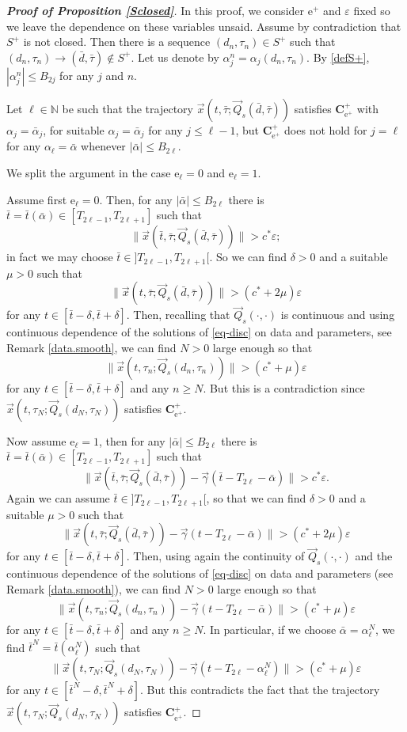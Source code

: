 \documentclass[10pt]{article}
\numberwithin{equation}{section}
\def\al{\alpha}
\def\ga{\vec{\gamma}}
\def\ep{\varepsilon}
\def\N{{\mathbb N}}
\def\ee{{\mathrm e}}
\def\Q{\vec{Q}}
\def\x{\vec{x}}
\newcommand\bs[1]{{\boldsymbol{#1}}}
\theoremstyle{definition}
\theoremstyle{remark}
\begin{document}
\begin{proof}[\textbf{Proof of Proposition \ref{Sclosed}}]
In this proof, we consider $\ee^+$ and $\ep$ fixed so we leave the dependence on these variables unsaid.
Assume by contradiction that $S^+$ is not closed. Then there is a sequence $(d_n, \tau_n) \in S^+$ such that
$(d_n, \tau_n)\to  (\bar{d}, \bar{\tau}) \not\in S^+$. Let us denote by  $\alpha_j^n=\alpha_j(d_n, \tau_n)$.
 By  \eqref{defS+}, $|\alpha_j^n | \le B_{2j}$ for any $j$ and $n$.


Let  $\ell \in \N$
be such that the trajectory $\x(t,\bar{\tau}; \Q_s(\bar{d},\bar{\tau}))$
satisfies $\bs{C^+_{\ee^+}}$  with   $\alpha_j = \bar{\alpha}_j$,
 for suitable
   $\alpha_j = \bar{\alpha}_j$
 for any $j \le \ell-1$, but $\bs{C^+_{\ee^+}}$ does not hold
 for $j=\ell$   for any $\alpha_{\ell}= \bar{\alpha}$ whenever $|\bar{\alpha}| \le B_{2 \ell}$.

We split the argument in the case $\ee_\ell=0$ and $\ee_\ell=1$.

Assume first $\ee_\ell=0$.
Then,  for any $|\bar{\alpha}| \le B_{2\ell}$ there is $\bar{t}=\bar{t}(\bar{\alpha}) \in [T_{2\ell-1},T_{2\ell+1}]$  such that
$$\|\x(\bar{t},\bar{\tau}; \Q_s(\bar{d},\bar{\tau})) \| >  c^*\ep ;$$
 in fact we may choose    $\bar{t}\in]T_{2\ell-1},T_{2\ell+1}[$.
So we can find $\delta>0$ and a suitable $\mu>0$ such that
$$\|\x(t,\bar{\tau}; \Q_s(\bar{d},\bar{\tau})) \| >  (c^*+2\mu) \ep $$
for any $t \in [\bar{t}-\delta, \bar{t}+\delta]$.
Then,  recalling that $\Q_s(\cdot,\cdot)$ is continuous  and using continuous dependence of the solutions of \eqref{eq-disc} on data and
parameters, see Remark \ref{data.smooth},
we can find $N>0$ large enough so that
$$\|\x(t,\tau_{n}; \Q_s(d_{n},\tau_{n})) \| >  (c^*+\mu) \ep $$
for any $t \in [\bar{t}-\delta, \bar{t}+\delta]$ and any $n \ge N$.
 But this is a contradiction since $\x(t,\tau_{N}; \Q_s(d_{N},\tau_{N}))$ satisfies   $\bs{C^+_{\ee^+}}$.


 Now assume $\ee_\ell=1$, then for any $|\bar{\alpha}| \le B_{2\ell}$ there is $\bar{t}=\bar{t}(\bar{\alpha}) \in [T_{2\ell-1},T_{2\ell+1}]$
 such that
$$\|\x(\bar{t},\bar{\tau}; \Q_s(\bar{d},\bar{\tau}))-\ga(\bar{t}- T_{2\ell}-\bar{\al}) \|> c^*\ep .$$
 Again we can assume $\bar{t} \in ]T_{2\ell-1},T_{2\ell+1}[$,
so that we can find $\delta>0$ and a suitable $\mu>0$ such that
$$\|\x(t,\bar{\tau}; \Q_s(\bar{d},\bar{\tau}))-\ga(t- T_{2\ell}-\bar{\al}) \|> (c^*+2 \mu)\ep $$
 for any $t \in [\bar{t}-\delta, \bar{t}+\delta]$.
 Then, using again  the continuity of $\Q_s(\cdot,\cdot)$ and the  continuous dependence of the solutions of \eqref{eq-disc} on data and
 parameters
 (see Remark \ref{data.smooth}),
we can find $N>0$ large enough so that
$$\|\x(t,\tau_{n}; \Q_s(d_{n},\tau_{n})) -\ga(t- T_{2\ell}-\bar{\al}) \| >  (c^*+\mu) \ep $$
for any $t \in [\bar{t}-\delta , \bar{t}+\delta]$ and any $n \ge N$.
 In particular, if we choose $\bar{\alpha}= \alpha^N_{\ell}$, we find $\bar{t}^N= \bar{t}(\alpha^N_{\ell})$ such that
$$\|\x(t,\tau_{N}; \Q_s(d_{N},\tau_{N})) -\ga(t- T_{2\ell}-\al^{N}_\ell) \| >  (c^*+\mu) \ep $$
for any $t \in [\bar{t}^N-\delta , \bar{t}^N+\delta]$.
But this contradicts the fact that the trajectory $\x(t,\tau_{N}; \Q_s(d_{N},\tau_{N}))$ satisfies   $\bs{C^+_{\ee^+}}$.


\end{proof}
\end{document}
